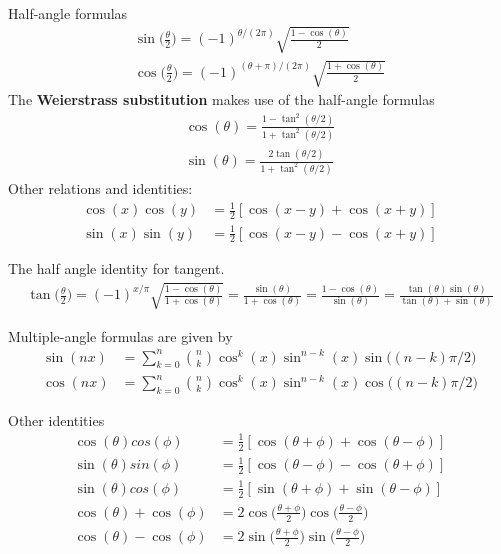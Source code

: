 \begin{multicols}{2}
\begin{align}
\end{align}
Half-angle formulas
\begin{align}
\sin\bigg(\frac{\theta}{2}\bigg)=(-1)^{\theta/(2\pi)}\sqrt{\frac{1-\cos(\theta)}{2}} \\
\cos\bigg(\frac{\theta}{2}\bigg)=(-1)^{(\theta+\pi)/(2\pi)}\sqrt{\frac{1+\cos(\theta)}{2}}
\end{align}
The \textbf{Weierstrass substitution} makes use of the half-angle formulas 
\begin{align}
\cos(\theta)=\frac{1-\tan^2(\theta/2)}{1+\tan^2(\theta/2)} \\
\sin(\theta)=\frac{2\tan(\theta/2)}{1+\tan^2(\theta/2)}
\end{align}
Other relations and identities:
\begin{align}
	\cos(x)\cos(y) &= \frac{1}{2}[\cos(x-y)+\cos(x+y)] \\
	\sin(x)\sin(y) &= \frac{1}{2}[\cos(x-y)-\cos(x+y)]
\end{align}
\end{multicols}
The half angle identity for tangent.
\begin{align}
\tan\bigg(\frac{\theta}{2}\bigg)=(-1)^{x/\pi}\sqrt{\frac{1-\cos(\theta)}{1+\cos(\theta)}} = \frac{\sin(\theta)}{1+\cos(\theta)}=\frac{1-\cos(\theta)}{\sin(\theta)}=\frac{\tan(\theta)\sin(\theta)}{\tan(\theta)+\sin(\theta)}
\end{align}

Multiple-angle formulas are given by 
\begin{align}
\sin(nx)&= \sum_{k=0}^{n}{{n}\choose{k}}\cos^k(x)\sin^{n-k}(x)\sin\big((n-k)\pi/2 \big) \\
\cos(nx)&= \sum_{k=0}^{n}{{n}\choose{k}}\cos^k(x)\sin^{n-k}(x)\cos\big((n-k)\pi/2 \big)
\end{align}

Other identities
\begin{align}
\cos(\theta)cos(\phi) &=\frac{1}{2}[\cos(\theta+\phi)+\cos(\theta-\phi)] \\
\sin(\theta)sin(\phi) &=\frac{1}{2}[\cos(\theta-\phi)-\cos(\theta+\phi)] \\
\sin(\theta)cos(\phi) &=\frac{1}{2}[\sin(\theta+\phi)+\sin(\theta-\phi)] \\
\cos(\theta)+\cos(\phi)&= 2\cos\bigg( \frac{\theta+\phi}{2}\bigg)\cos\bigg( \frac{\theta-\phi}{2}\bigg) \\
\cos(\theta)-\cos(\phi)&= 2\sin\bigg( \frac{\theta+\phi}{2}\bigg)\sin\bigg( \frac{\theta-\phi}{2}\bigg)
\end{align}








